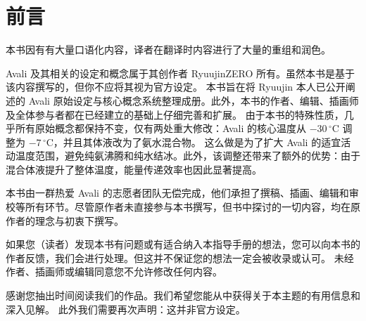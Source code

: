 \section*{前言}

\begin{TranslatorNoteBox}
	本书因有有大量口语化内容，译者在翻译时内容进行了大量的重组和润色。
\end{TranslatorNoteBox}

Avali 及其相关的设定和概念属于其创作者 RyuujinZERO 所有。虽然本书是基于该内容撰写的，但你不应将其视为官方设定。
本书旨在将 Ryuujin 本人已公开阐述的 Avali 原始设定与核心概念系统整理成册。此外，本书的作者、编辑、插画师及全体参与者都在已经建立的基础上仔细完善和扩展。
由于本书的特殊性质，几乎所有原始概念都保持不变，仅有两处重大修改：Avali 的核心温度从 $-30\,^\circ\mathrm{C}$ 调整为 $-7\,^\circ\mathrm{C}$，并且其体液改为了氨水混合物。
这么做是为了扩大 Avali 的适宜活动温度范围，避免纯氨沸腾和纯水结冰。此外，该调整还带来了额外的优势：由于混合体液提升了整体温度，能量传递效率也因此显著提高。

本书由一群热爱 Avali 的志愿者团队无偿完成，他们承担了撰稿、插画、编辑和审校等所有环节。尽管原作者未直接参与本书撰写，但书中探讨的一切内容，均在原作者的理念与初衷下撰写。


如果您（读者）发现本书有问题或有适合纳入本指导手册的想法，您可以向本书的作者反馈，我们会进行处理。但这并不保证您的想法一定会被收录或认可。
未经作者、插画师或编辑同意您不允许修改任何内容。

感谢您抽出时间阅读我们的作品。我们希望您能从中获得关于本主题的有用信息和深入见解。
此外我们需要再次声明：这并非官方设定。

\clearpage
